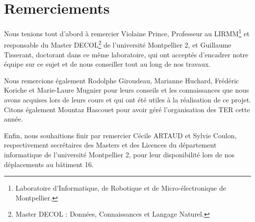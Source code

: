 \chapter*{Remerciements}

Nous tenions tout d'abord à remercier \mbox{Violaine} \mbox{Prince}, Professeur au LIRMM\footnote{Laboratoire d'Informatique, de Robotique et de Micro-électronique de Montpellier.} et responsable du Master DECOL\footnote{Master DECOL : Données, Connaissances et Langage Naturel.} de l'université Montpellier 2, et \mbox{Guillaume} \mbox{Tisserant}, doctorant dans ce même laboratoire, qui ont acceptés d'encadrer notre équipe sur ce sujet et de nous conseiller tout au long de nos travaux.

Nous remercions également \mbox{Rodolphe} \mbox{Giroudeau}, \mbox{Marianne} \mbox{Huchard}, \mbox{Frédéric} \mbox{Koriche} et \mbox{Marie-Laure} \mbox{Mugnier} pour leurs conseils et les connaissances que nous avons acquises lors de leurs cours et qui ont été utiles à la réalisation de ce projet. Citons également \mbox{Mountaz} \mbox{Hascouet} pour avoir géré l'organisation des TER cette année.

Enfin, nous souhaitions finir par remercier \mbox{Cécile} \mbox{ARTAUD} et \mbox{Sylvie} \mbox{Coulon}, respectivement secrétaires des Masters et des Licences du département informatique de l'université Montpellier 2, pour leur disponibilité lors de nos déplacements au bâtiment 16.

